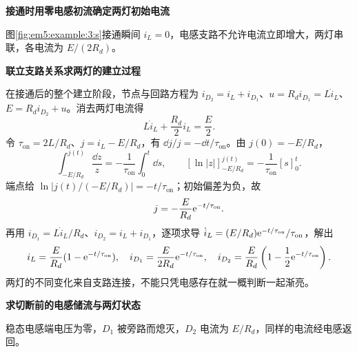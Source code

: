 \begin{solution}\textbf{接通时用零电感初流确定两灯初始电流}\par\nobreak
图\ref{fig:em5:example:3:s}接通瞬间 $i_L=0$，电感支路不允许电流立即增大，两灯串联，各电流为 $E/(2R_d)$。


\par\medskip{}\noindent\textbf{联立支路关系求两灯的建立过程}\par\nobreak
在接通后的整个建立阶段，节点与回路方程为 $i_{D_2}=i_L+i_{D_1}$、$u=R_di_{D_1}=L\dot i_L$、$E=R_di_{D_2}+u$。消去两灯电流得
\[L\dot i_L+\frac{R_d}{2}i_L=\frac E2.\]
令 $\tau_{\mathrm{on}}=2L/R_d$、$j=i_L-E/R_d$，有
$\dd j/j=-\dd t/\tau_{\mathrm{on}}$。由 $j(0)=-E/R_d$，
\[
 \int_{-E/R_d}^{j(t)}\frac{\dd z}{z}
 =-\frac1{\tau_{\mathrm{on}}}\int_0^t\dd s,\qquad
 [\ln|z|]_{-E/R_d}^{j(t)}=-\frac1{\tau_{\mathrm{on}}}[s]_0^t.
\]
端点给 $\ln|j(t)/(-E/R_d)|=-t/\tau_{\mathrm{on}}$；初始偏差为负，故
\[
\qquad j=-\frac E{R_d}\mathrm e^{-t/\tau_{\mathrm{on}}}.
\]
再用 $i_{D_1}=L\dot i_L/R_d$、$i_{D_2}=i_L+i_{D_1}$，逐项求导 $\dot i_L=(E/R_d)\mathrm e^{-t/\tau_{\mathrm{on}}}/\tau_{\mathrm{on}}$，解出
\[i_L=\frac E{R_d}(1-\mathrm e^{-t/\tau_{\mathrm{on}}}),\quad
i_{D_1}=\frac E{2R_d}\mathrm e^{-t/\tau_{\mathrm{on}}},\quad
i_{D_2}=\frac E{R_d}\left(1-\frac12\mathrm e^{-t/\tau_{\mathrm{on}}}\right).\]
两灯的不同变化来自支路连接，不能只凭电感存在就一概判断一起渐亮。





\par\medskip{}\noindent\textbf{求切断前的电感储流与两灯状态}\par\nobreak
稳态电感端电压为零，$D_1$ 被旁路而熄灭，$D_2$ 电流为 $E/R_d$，同样的电流经电感返回。




\end{solution}
